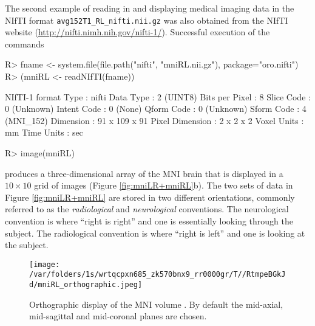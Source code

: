 \documentclass[
]{jss}
\begin{document}
The second example of reading in and displaying medical imaging data in
the NIfTI format \texttt{avg152T1\_RL\_nifti.nii.gz} was also obtained
from the NIfTI website (\url{http://nifti.nimh.nih.gov/nifti-1/}).
Successful execution of the commands

\begin{CodeChunk}

\begin{CodeInput}
R> fname <- system.file(file.path("nifti", "mniRL.nii.gz"), package="oro.nifti")
R> (mniRL <- readNIfTI(fname))
\end{CodeInput}

\begin{CodeOutput}
NIfTI-1 format
  Type            : nifti
  Data Type       : 2 (UINT8)
  Bits per Pixel  : 8
  Slice Code      : 0 (Unknown)
  Intent Code     : 0 (None)
  Qform Code      : 0 (Unknown)
  Sform Code      : 4 (MNI_152)
  Dimension       : 91 x 109 x 91
  Pixel Dimension : 2 x 2 x 2
  Voxel Units     : mm
  Time Units      : sec
\end{CodeOutput}
\end{CodeChunk}

\begin{CodeChunk}

\begin{CodeInput}
R> image(mniRL)
\end{CodeInput}
\end{CodeChunk}

produces a three-dimensional array of the MNI brain that is displayed in
a \(10{\times}10\) grid of images (Figure \ref{fig:mniLR+mniRL}b). The
two sets of data in Figure \ref{fig:mniLR+mniRL} are stored in two
different orientations, commonly referred to as the \emph{radiological}
and \emph{neurological} conventions. The neurological convention is
where ``right is right'' and one is essentially looking through the
subject. The radiological convention is where ``right is left'' and one
is looking at the subject.

\begin{figure}[tbp]
  \begin{center}
    \texttt{[image: /var/folders/1s/wrtqcpxn685\_zk570bnx9\_rr0000gr/T//RtmpeBGkJd/mniRL\_orthographic.jpeg]}
    \end{center}
  \caption{Orthographic display of the MNI volume .
    By default the mid-axial, mid-sagittal and mid-coronal planes are
    chosen.}
  \label{fig:mniRL-orthographic}
\end{figure}
\end{document}
